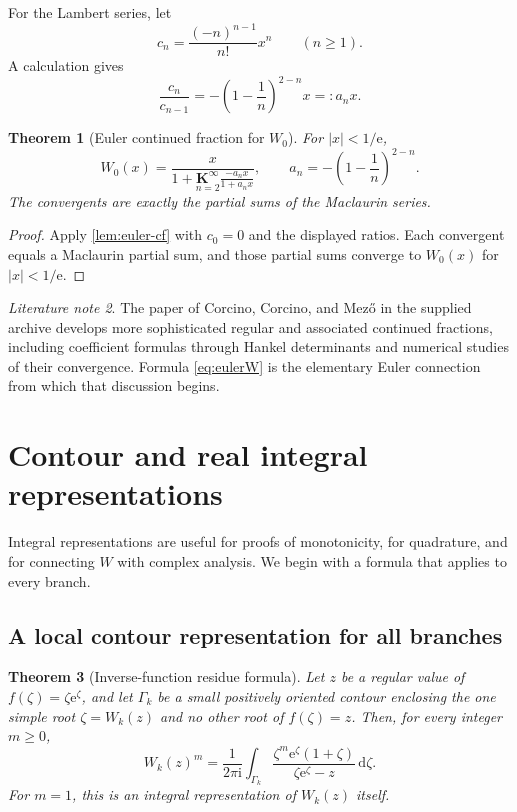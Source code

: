 \documentclass[11pt]{article}
\newtheorem{theorem}{Theorem}[section]
\theoremstyle{remark}
\newtheorem{literaturenote}[theorem]{Literature note}
\newcommand{\Wz}{W_0}
\newcommand{\ee}{\mathrm e}
\newcommand{\ii}{\mathrm i}
\newcommand{\abs}[1]{\left|#1\right|}
\newcommand{\dd}{\,\mathrm d}
\begin{document}
For the Lambert series, let
\[
       c_n=\frac{(-n)^{n-1}}{n!}x^n\qquad(n\geq1).
\]
A calculation gives
\[
 \frac{c_n}{c_{n-1}}
 =-\left(1-\frac1n\right)^{2-n}x=:a_nx.
\]

\begin{theorem}[Euler continued fraction for \(W_0\)]\label{thm:eulerW}
For \(\abs{x}<1/\ee\),
\begin{equation}\label{eq:eulerW}
 \boxed{\displaystyle
 \Wz(x)=
 \frac{x}{
  1+\underset{n=2}{\mathbf K^\infty}
  \frac{-a_nx}{1+a_nx}},
 \qquad
 a_n=-\left(1-\frac1n\right)^{2-n}.}
\end{equation}
The convergents are exactly the partial sums of the Maclaurin series.
\end{theorem}

\begin{proof}
Apply \cref{lem:euler-cf} with \(c_0=0\) and the displayed ratios.
Each convergent equals a Maclaurin partial sum, and those partial sums
converge to \(\Wz(x)\) for \(\abs{x}<1/\ee\).
\end{proof}

\begin{literaturenote}
The paper of Corcino, Corcino, and Mez\H{o} in the supplied archive develops
more sophisticated regular and associated continued fractions, including
coefficient formulas through Hankel determinants and numerical studies of
their convergence.  Formula \eqref{eq:eulerW} is the elementary Euler
connection from which that discussion begins.
\end{literaturenote}


\section{Contour and real integral representations}\label{sec:integralreps}

Integral representations are useful for proofs of monotonicity, for
quadrature, and for connecting \(W\) with complex analysis.  We begin with a
formula that applies to every branch.

\subsection{A local contour representation for all branches}

\begin{theorem}[Inverse-function residue formula]\label{thm:contour-all}
Let \(z\) be a regular value of \(f(\zeta)=\zeta\ee^\zeta\), and let
\(\Gamma_k\) be a small positively oriented contour enclosing the one simple
root \(\zeta=W_k(z)\) and no other root of \(f(\zeta)=z\).  Then, for every
integer \(m\geq0\),
\begin{equation}\label{eq:contour-all}
 W_k(z)^m
 =\frac{1}{2\pi\ii}\int_{\Gamma_k}
 \frac{\zeta^m\ee^\zeta(1+\zeta)}
      {\zeta\ee^\zeta-z}\dd\zeta.
\end{equation}
For \(m=1\), this is an integral representation of \(W_k(z)\) itself.
\end{theorem}
\end{document}
